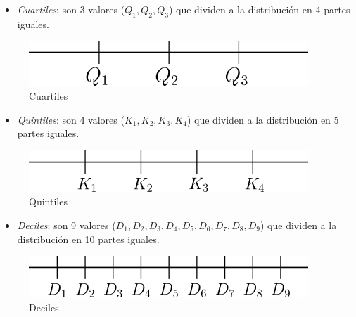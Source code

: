 \documentclass[letterpaper,]{book}
\providecommand{\tightlist}{%
  \setlength{\itemsep}{0pt}\setlength{\parskip}{0pt}}
\begin{document}
\begin{itemize}
\tightlist
\item
  \emph{Cuartiles}: son 3 valores (\(Q_{1}, Q_{2}, Q_{3}\)) que dividen a la distribución en 4 partes iguales.
\end{itemize}

\begin{figure}[!h]

{\centering \includegraphics[width=0.5\linewidth]{cuartiles} 

}

\caption{Cuartiles}\label{fig:cuart}
\end{figure}

\begin{itemize}
\tightlist
\item
  \emph{Quintiles}: son 4 valores (\(K_{1}, K_{2}, K_{3}, K_{4}\)) que dividen a la distribución en 5 partes iguales.
\end{itemize}

\begin{figure}[!h]

{\centering \includegraphics[width=0.5\linewidth]{quintiles} 

}

\caption{Quintiles}\label{fig:quint}
\end{figure}

\begin{itemize}
\tightlist
\item
  \emph{Deciles}: son 9 valores (\(D_1, D_2, D_3, D_4, D_5, D_6, D_7, D_8, D_9\)) que dividen a la distribución en 10 partes iguales.
\end{itemize}

\begin{figure}[!h]

{\centering \includegraphics[width=0.5\linewidth]{deciles} 

}

\caption{Deciles}\label{fig:decil}
\end{figure}
\end{document}
